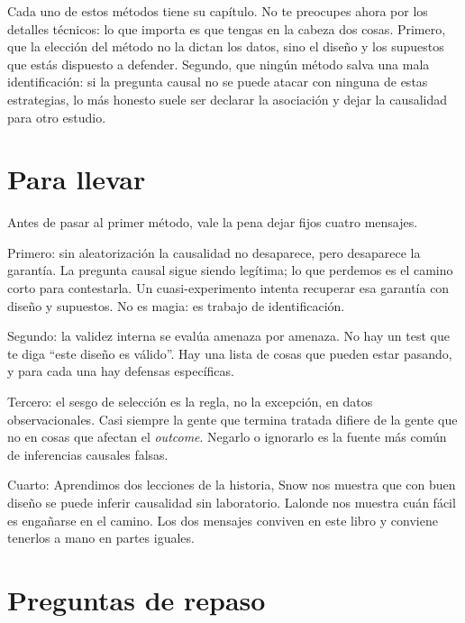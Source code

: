 \documentclass[
  letterpaper,
  DIV=11,
  numbers=noendperiod,
  oneside]{scrreprt}
\begin{document}
Cada uno de estos métodos tiene su capítulo. No te preocupes ahora por
los detalles técnicos: lo que importa es que tengas en la cabeza dos
cosas. Primero, que la elección del método no la dictan los datos, sino
el diseño y los supuestos que estás dispuesto a defender. Segundo, que
ningún método salva una mala identificación: si la pregunta causal no se
puede atacar con ninguna de estas estrategias, lo más honesto suele ser
declarar la asociación y dejar la causalidad para otro estudio.

\hypertarget{para-llevar}{%
\section{Para llevar}\label{para-llevar}}

Antes de pasar al primer método, vale la pena dejar fijos cuatro
mensajes.

Primero: sin aleatorización la causalidad no desaparece, pero desaparece
la garantía. La pregunta causal sigue siendo legítima; lo que perdemos
es el camino corto para contestarla. Un cuasi-experimento intenta
recuperar esa garantía con diseño y supuestos. No es magia: es trabajo
de identificación.

Segundo: la validez interna se evalúa amenaza por amenaza. No hay un
test que te diga ``este diseño es válido''. Hay una lista de cosas que
pueden estar pasando, y para cada una hay defensas específicas.

Tercero: el sesgo de selección es la regla, no la excepción, en datos
observacionales. Casi siempre la gente que termina tratada difiere de la
gente que no en cosas que afectan el \emph{outcome}. Negarlo o ignorarlo
es la fuente más común de inferencias causales falsas.

Cuarto: Aprendimos dos lecciones de la historia, Snow nos muestra que
con buen diseño se puede inferir causalidad sin laboratorio. Lalonde nos
muestra cuán fácil es engañarse en el camino. Los dos mensajes conviven
en este libro y conviene tenerlos a mano en partes iguales.

\hypertarget{preguntas-de-repaso-4}{%
\section{Preguntas de repaso}\label{preguntas-de-repaso-4}}
\end{document}
